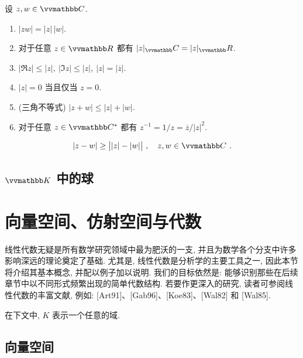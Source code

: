 \begin{proposition}\label{prop:computation-in-C}
    
\end{proposition}

\begin{proposition}\label{prop:abs-in-C}
    设 \(z, w \in \C\).
    \begin{enumerate}
        \item \(|z w| = |z| \, |w|\).
        \item 对于任意 \(z \in \R\) 都有 \(|z|_\C = |z|_\R\).
        \item \(|\Re z| \leq |z|,\ |\Im z| \leq |z|,\ |z| = |\overline z|\).
        \item \(|z| = 0\) 当且仅当 \(z = 0\).
        \item (三角不等式) \(|z + w| \leq |z| + |w|\).
        \item 对于任意 \(z \in \C^\ast\) 都有 \(z^{- 1} = 1 / z = \overline z / |z|^2\).
    \end{enumerate}
\end{proposition}

\begin{corollary}[反三角不等式]\label{cor:reversed-triangle-inequality-in-C}
    \[
        |z - w| \geq \bigl||z| - |w|\bigr|\ ,\quad z, w \in \C\ .
    \]
\end{corollary}

\subsection{\(\K\) 中的球}

\newpage

\section{向量空间、仿射空间与代数}

线性代数无疑是所有数学研究领域中最为肥沃的一支, 并且为数学各个分支中许多影响深远的理论奠定了基础. 尤其是, 线性代数是分析学的主要工具之一, 因此本节将介绍其基本概念, 并配以例子加以说明. 我们的目标依然是: 能够识别那些在后续章节中以不同形式频繁出现的简单代数结构. 若要作更深入的研究, 读者可参阅线性代数的丰富文献, 例如: [Art91]、[Gab96]、[Koe83]、[Wal82] 和 [Wal85].

在下文中, \(K\) 表示一个任意的域.

\subsection{向量空间}

